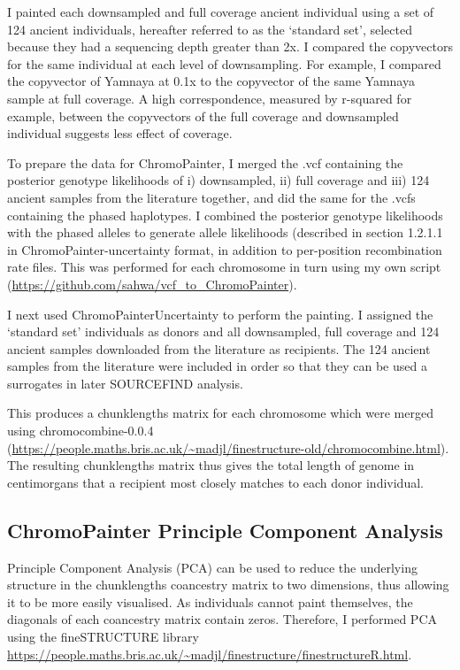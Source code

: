 I painted each downsampled and full coverage ancient individual using a set of 124 ancient individuals, hereafter referred to as the `standard set', selected because they had a sequencing depth greater than 2x. I compared the copyvectors for the same individual at each level of downsampling. For example, I compared the copyvector of Yamnaya at 0.1x to the copyvector of the same Yamnaya sample at full coverage. A high correspondence, measured by r-squared for example, between the copyvectors of the full coverage and downsampled individual suggests less effect of coverage. 

To prepare the data for ChromoPainter, I merged the .vcf containing the posterior genotype likelihoods of i) downsampled, ii) full coverage and iii) 124 ancient samples from the literature together, and did the same for the .vcfs containing the phased haplotypes.  I combined the posterior genotype likelihoods with the phased alleles to generate allele likelihoods (described in section 1.2.1.1 in ChromoPainter-uncertainty format, in addition to per-position recombination rate files. This was performed for each chromosome in turn using my own script (\url{https://github.com/sahwa/vcf_to_ChromoPainter}).

I next used ChromoPainterUncertainty to perform the painting. I assigned the `standard set' individuals as donors and all downsampled, full coverage and 124 ancient samples downloaded from the literature as recipients. The 124 ancient samples from the literature were included in order so that they can be used a surrogates in later SOURCEFIND analysis.

This produces a chunklengths matrix for each chromosome which were merged using chromocombine-0.0.4 (\url{https://people.maths.bris.ac.uk/~madjl/finestructure-old/chromocombine.html}). The resulting chunklengths matrix thus gives the total length of genome in centimorgans that a recipient most closely matches to each donor individual. 

\subsection{ChromoPainter Principle Component Analysis}

Principle Component Analysis (PCA) can be used to reduce the underlying structure in the chunklengths coancestry matrix to two dimensions, thus allowing it to be more easily visualised. As individuals cannot paint themselves, the diagonals of each coancestry matrix contain zeros. Therefore, I performed PCA using the fineSTRUCTURE library \url{https://people.maths.bris.ac.uk/~madjl/finestructure/finestructureR.html}.


